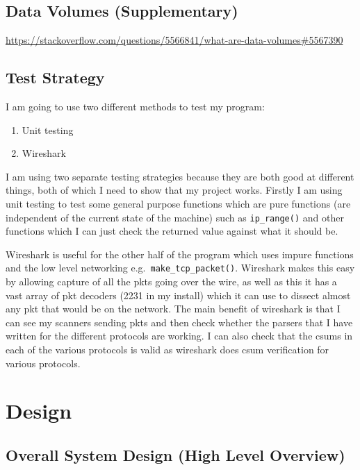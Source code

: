 \documentclass[titlepage]{article}
\let\Oldsection\section{}
\renewcommand{\section}{\FloatBarrier\Oldsection}
\let\Oldsubsection\subsection{}
\renewcommand{\subsection}{\FloatBarrier\Oldsubsection}
\begin{document}
\subsection{Data Volumes (Supplementary)}

\textbf{\color{red}{This seems to be about the volume of data stored in a database.}}
\href{https://stackoverflow.com/questions/5566841/what-are-data-volumes#5567390}{https://stackoverflow.com/questions/5566841/what-are-data-volumes\#5567390}

\subsection{Test Strategy}

I am going to use two different methods to test my program:
\begin{enumerate}
\item{Unit testing}
\item{Wireshark}
\end{enumerate}
I am using two separate testing strategies because they are both good at different things,
both of which I need to show that my project works. Firstly I am using unit testing to test
some general purpose functions which are pure functions (are independent of the current state
of the machine) such as \verb|ip_range()| and other functions which I can
just check the returned value against what it should be.

Wireshark is useful for the other half of the program which uses impure functions and the
low level networking e.g.\ \verb|make_tcp_packet()|. Wireshark makes this easy by allowing capture of all
the \glspl{pkt} going over the wire, as well as this it has a vast array of \gls{pkt} decoders (2231 in my install)
which it can use to dissect almost any \gls{pkt} that would be on the network. The main
benefit of wireshark is that I can see my scanners sending \glspl{pkt} and then check whether the parsers
that I have written for the different protocols are working. I can also check that the \glspl{csum}
in each of the various protocols is valid as wireshark does \gls{csum} verification for various protocols.

\section{Design}

\subsection{Overall System Design (High Level Overview)}
\end{document}
